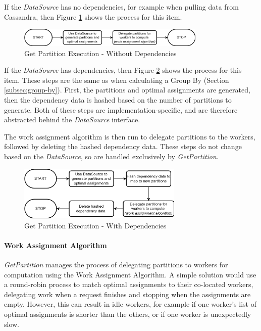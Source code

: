 If the \textit{DataSource} has no dependencies, for example when pulling data from Cassandra, then Figure \ref{fig:get-partition-no-dependencies} shows the process for this item. 

\begin{figure}[h]
	\centering
	\includegraphics[width=0.8\textwidth]{chapters/diagrams/implementation/get-partition-no-dependencies-flow}
	\caption{Get Partition Execution - Without Dependencies}
	\label{fig:get-partition-no-dependencies}
\end{figure}

If the \textit{DataSource} has dependencies, then Figure \ref{fig:get-partition-dependencies} shows the process for this item. These steps are the same as when calculating a Group By (Section \ref{subsec:group-by}). First, the partitions and optimal assignments are generated, then the dependency data is hashed based on the number of partitions to generate. Both of these steps are implementation-specific, and are therefore abstracted behind the \textit{DataSource} interface. 

The work assignment algorithm is then run to delegate partitions to the workers, followed by deleting the hashed dependency data. These steps do not change based on the \textit{DataSource}, so are handled exclusively by \textit{GetPartition}.
\begin{figure}[h]
	\centering
	\includegraphics[width=0.7\textwidth]{chapters/diagrams/implementation/get-partition-dependencies-flow}
	\caption{Get Partition Execution - With Dependencies}
	\label{fig:get-partition-dependencies}
\end{figure}

\paragraph{Work Assignment Algorithm} %
\textit{GetPartition} manages the process of delegating partitions to workers for computation using the Work Assignment Algorithm. A simple solution would use a round-robin process to match optimal assignments to their co-located workers, delegating work when a request finishes and stopping when the assignments are empty. However, this can result in idle workers, for example if one worker's list of optimal assignments is shorter than the others, or if one worker is unexpectedly slow.

